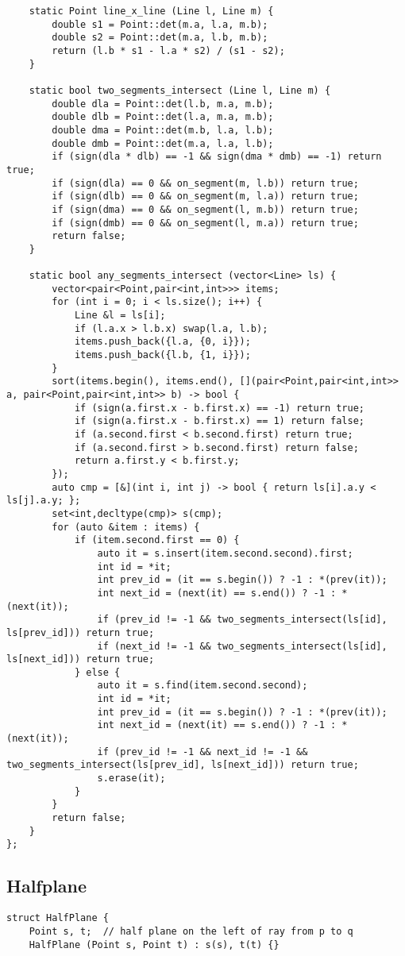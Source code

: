 \documentclass[10pt,landscape]{article}
\begin{document}
\begin{multicols}{2}
\begin{lstlisting}
	static Point line_x_line (Line l, Line m) {
		double s1 = Point::det(m.a, l.a, m.b);
		double s2 = Point::det(m.a, l.b, m.b);
		return (l.b * s1 - l.a * s2) / (s1 - s2);
	}

	static bool two_segments_intersect (Line l, Line m) {
		double dla = Point::det(l.b, m.a, m.b);
		double dlb = Point::det(l.a, m.a, m.b);
		double dma = Point::det(m.b, l.a, l.b);
		double dmb = Point::det(m.a, l.a, l.b);
		if (sign(dla * dlb) == -1 && sign(dma * dmb) == -1) return true;
		if (sign(dla) == 0 && on_segment(m, l.b)) return true;
		if (sign(dlb) == 0 && on_segment(m, l.a)) return true;
		if (sign(dma) == 0 && on_segment(l, m.b)) return true;
		if (sign(dmb) == 0 && on_segment(l, m.a)) return true;
		return false;
	}

	static bool any_segments_intersect (vector<Line> ls) {
		vector<pair<Point,pair<int,int>>> items;
		for (int i = 0; i < ls.size(); i++) {
			Line &l = ls[i];
			if (l.a.x > l.b.x) swap(l.a, l.b);
			items.push_back({l.a, {0, i}});
			items.push_back({l.b, {1, i}});
		}
		sort(items.begin(), items.end(), [](pair<Point,pair<int,int>> a, pair<Point,pair<int,int>> b) -> bool {
			if (sign(a.first.x - b.first.x) == -1) return true;
			if (sign(a.first.x - b.first.x) == 1) return false;
			if (a.second.first < b.second.first) return true;
			if (a.second.first > b.second.first) return false;
			return a.first.y < b.first.y;
		});
		auto cmp = [&](int i, int j) -> bool { return ls[i].a.y < ls[j].a.y; };
		set<int,decltype(cmp)> s(cmp);
		for (auto &item : items) {
			if (item.second.first == 0) {
				auto it = s.insert(item.second.second).first;
				int id = *it;
				int prev_id = (it == s.begin()) ? -1 : *(prev(it));
				int next_id = (next(it) == s.end()) ? -1 : *(next(it));
				if (prev_id != -1 && two_segments_intersect(ls[id], ls[prev_id])) return true;
				if (next_id != -1 && two_segments_intersect(ls[id], ls[next_id])) return true;
			} else {
				auto it = s.find(item.second.second);
				int id = *it;
				int prev_id = (it == s.begin()) ? -1 : *(prev(it));
				int next_id = (next(it) == s.end()) ? -1 : *(next(it));
				if (prev_id != -1 && next_id != -1 && two_segments_intersect(ls[prev_id], ls[next_id])) return true;
				s.erase(it);
			}
		}
		return false;
	}
};
\end{lstlisting}
\subsection{Halfplane}
\begin{lstlisting}
struct HalfPlane {
	Point s, t;  // half plane on the left of ray from p to q
	HalfPlane (Point s, Point t) : s(s), t(t) {}


\end{lstlisting}
\end{multicols}
\end{document}
